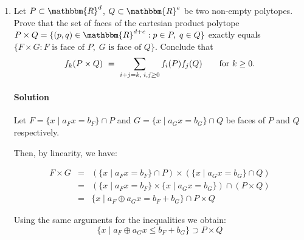 \documentclass[a4paper,10pt]{article}
\newcommand{\st}{ \; \left| \right. \;}
\newcommand{\R}{\mathbbm{R}}
\begin{document}
\begin{enumerate}
\begin{proof}
      with equality if and only if all $p_{i_j}$ are vertices of $P$ in $F$. As $p\in F$, the equality is required. Thus, $p$ is in the convex hull of vertices of $P$ in the face $F$.
      
    \end{proof}

    \item Let $P\subset\R^d$, $Q\subset\R^e$ be two non-empty polytopes. Prove that the set of faces of the cartesian product polytope $P\times Q=\{(p,q)\in\R^{d+e}:p\in P,\; q\in Q\}$ exactly equals $\{F\times G: F\text{ is face of }P, \;G\text{ is face of }Q\}$. Conclude that
\[
    f_k(P\times Q)
    \ = \
    \sum_{%
      i+j=k,\;i,j\ge0}f_i(P) f_j(Q)
    \qquad
    \text{for } k\ge0.
\]


    \paragraph{Solution}
    
    Let $F = \{ x \st a_F x = b_F \} \cap P$ and $ G = \{ x \st a_G x = b_G\} \cap Q$ be faces of $P$ and $Q$ respectively.
    
    Then, by linearity, we have:
    
    \begin{displaymath}
      \begin{array}{ccc}
        F \times G &  = & \left(\{ x \st a_F x = b_F \} \cap P\right) \times \left( \{ x \st a_G x = b_G\} \cap Q \right) \\
         & = &  \left( \{ x \st a_F x = b_F \} \times \{ x \st a_G x = b_G\}\right) \cap \left(P\times Q\right)\\
         & = &  \{ x \st a_F\oplus a_G x = b_F + b_G\} \cap P \times Q
      \end{array}
    \end{displaymath}
    


    Using the same arguments for the inequalities we obtain:
    \begin{displaymath}
       \{ x \st a_F\oplus a_G x \leq b_F + b_G\} \supset P\times Q
    \end{displaymath}
    

\end{enumerate}
\end{document}
